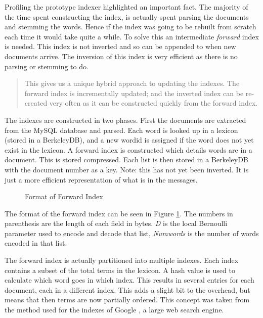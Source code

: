 Profiling the prototype indexer highlighted an important fact.  The majority of the time spent constructing the index, is actually spent parsing the documents and stemming the words.  Hence if the index was going to be rebuilt from scratch each time it would take quite a while.  To solve this an intermediate \emph{forward} index is needed.  This index is not inverted and so can be appended to when new documents arrive.  The inversion of this index is very efficient as there is no parsing or stemming to do.

\begin{quote}
  This gives us a unique hybrid approach to updating the indexes.  The
  forward index is incrementally updated; and the inverted index can
  be re-created very often as it can be constructed quickly from the
  forward index.
\end{quote}

The indexes are constructed in two phases.  First the documents are extracted from the MySQL database and parsed.  Each word is looked up in a lexicon (stored in a BerkeleyDB), and a new wordid is assigned if the word does not yet exist in the lexicon.  A forward index is constructed which details words are in a document.  This is stored compressed.  Each list is then stored in a BerkeleyDB with the document number as a key.  Note: this has not yet been inverted.  It is just a more efficient representation of what is in the messages.

\begin{figure}[htbp]
  \begin{center}
    \caption{Format of Forward Index}
    \label{fig:forward}
  \end{center}
\end{figure}

The format of the forward index can be seen in Figure \ref{fig:forward}.  The numbers in parenthesis are the length of each field in bytes. \emph{D} is the local Bernoulli parameter used to encode and decode that list, \emph{Numwords} is the number of words encoded in that list.

The forward index is actually partitioned into multiple indexes.  Each index contains a subset of the total terms in the lexicon.  A hash value is used to calculate which word goes in which index.  This results in several entries for each document, each in a different index.  This adds a slight bit to the overhead, but means that then terms are now partially ordered.  This concept was taken from the method used for the indexes of Google \cite{Brin+Page+1998a}, a large web search engine.

